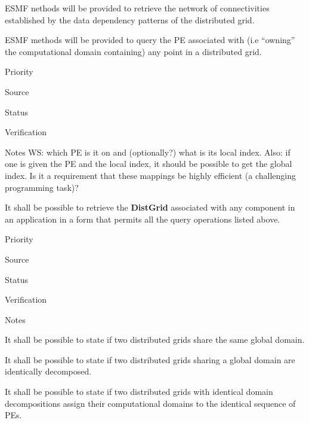 
ESMF nethods will be provided to retrieve the network of
connectivities established by the data dependency patterns of the
distributed grid.


ESMF methods will be provided to query the PE associated with (i.e
``owning'' the computational domain containing) any point in a
distributed grid.

\begin{reqlist}
\item[Priority]
\item[Source]
\item[Status]
\item[Verification]
\item[Notes] WS: which PE is it on and (optionally?) what 
is its local index.  Also: if one is given the PE and the local index, 
it should be possible to get the global index.  Is it a requirement that
these mappings be highly efficient (a challenging programming task)?
\end{reqlist}


It shall be possible to retrieve the \textbf{DistGrid} associated with
any component in an application in a form that permits all the query
operations listed above.

\begin{reqlist}
\item[Priority]
\item[Source]
\item[Status]
\item[Verification]
\item[Notes]
\end{reqlist}



It shall be possible to state if two distributed grids share the same
global domain.


It shall be possible to state if two distributed grids sharing a
global domain are identically decomposed.


It shall be possible to state if two distributed grids with identical
domain decompositions assign their computational domains to the
identical sequence of PEs.

